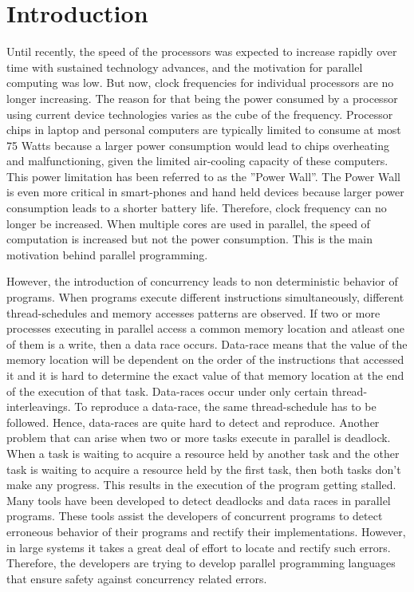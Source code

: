 \section{Introduction}

Until recently, the speed of the processors was expected to increase rapidly over time with sustained technology advances, and the motivation for parallel computing was low. But now, clock frequencies for individual processors are no longer increasing. The reason for that being the power consumed by a processor using current device technologies varies as the cube of the frequency. Processor chips in laptop and personal computers are typically limited to consume at most 75 Watts because a larger power consumption would lead to chips overheating and malfunctioning, given the limited air-cooling capacity of these computers. This power limitation has been referred to as the ''Power Wall''. The Power Wall is even more critical in smart-phones and hand held devices because larger power consumption leads to a shorter battery life. Therefore, clock frequency can no longer be increased. When multiple cores are used in parallel, the speed of computation is increased but not the power consumption. This is the main motivation behind parallel programming.

 However, the introduction of concurrency leads to non deterministic behavior of programs. When programs execute different instructions simultaneously, different thread-schedules and memory accesses patterns are observed. If two or more processes executing in parallel access a common memory location and atleast one of them is a write, then a data race occurs. Data-race means that the value of the memory location will be dependent on the order of the instructions that accessed it and it is hard to determine the exact value of that memory location at the end of the execution of that task. Data-races occur under only certain thread-interleavings. To reproduce a data-race, the same thread-schedule has to be followed. Hence, data-races are quite hard to detect and reproduce. Another problem that can arise when two or more tasks execute in parallel is deadlock. When a task is waiting to acquire a resource held by another task and the other task is waiting to acquire a resource held by the first task, then both tasks don't make any progress. This results in the execution of the program getting stalled. Many tools have been developed to detect deadlocks and data races in parallel programs. These tools assist the developers of concurrent programs to detect erroneous behavior of their programs and rectify their implementations. However, in large systems it takes a great deal of effort to locate and rectify such errors. Therefore, the developers are trying to develop parallel programming languages that ensure safety against concurrency related errors. 
 
